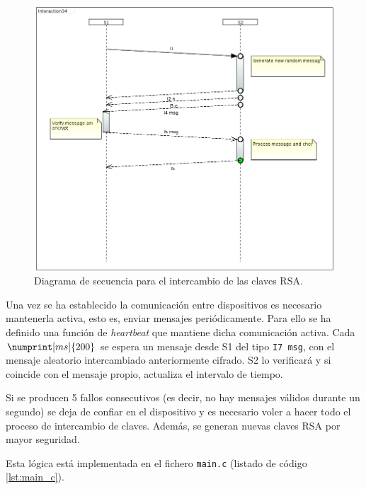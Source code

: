 \begin{figure}[H]
    \centering
    \includegraphics[width=.8\linewidth]{pictures/rsa.png}
    \caption{Diagrama de secuencia para el intercambio de las claves RSA.}
    \label{fig:rsa}
\end{figure}

Una vez se ha establecido la comunicación entre dispositivos es necesario mantenerla
activa, esto es, enviar mensajes periódicamente. Para ello se ha definido una función
de \textit{heartbeat} que mantiene dicha comunicación activa. Cada $\numprint[ms]{200}$
se espera un mensaje desde \ac{S1} del tipo \texttt{I7 msg}, con el mensaje aleatorio
intercambiado anteriormente cifrado. \ac{S2} lo verificará y si coincide con el mensaje
propio, actualiza el intervalo de tiempo.

Si se producen 5 fallos consecutivos (es decir, no hay mensajes válidos durante
un segundo) se deja de confiar en el dispositivo y es necesario voler a hacer
todo el proceso de intercambio de claves. Además, se generan nuevas claves RSA
por mayor seguridad.

Esta lógica está implementada en el fichero \texttt{main.c} (listado de código
\ref{lst:main_c}).
